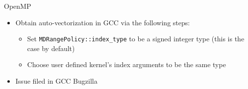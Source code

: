 
\begin{frame}[fragile]

  {\Huge OpenMP}
  \begin{itemize}
    \item Obtain auto-vectorization in GCC via the following steps:
    \begin{itemize}
      \item Set \texttt{MDRangePolicy::index\_type} to be a signed integer type (this is the case by default)
      \item Choose user defined kernel's index arguments to be the same type
    \end{itemize}
    \item Issue filed in GCC Bugzilla
  \end{itemize}

\end{frame}

